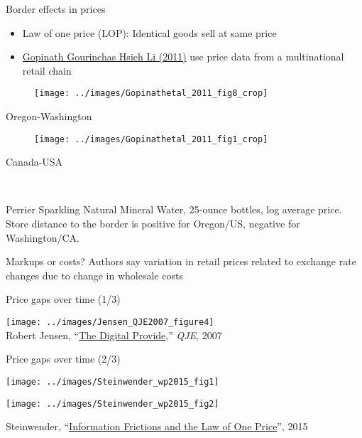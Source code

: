 \documentclass[10pt,notes=hide,aspectratio=169]{beamer}
\begin{document}
\begin{frame}{Border effects in prices}
\begin{itemize}
	\item Law of one price (LOP): Identical goods sell at same price
	\item \href{https://www.aeaweb.org/articles?id=10.1257/aer.101.6.2450}{Gopinath Gourinchas Hsieh Li (2011)} use price data from a multinational retail chain
\end{itemize}
	\begin{minipage}{.45\textwidth} \begin{center}\begin{figure} \texttt{[image: ../images/Gopinathetal\_2011\_fig8\_crop]}\end{figure} Oregon-Washington \end{center} \end{minipage}
	\begin{minipage}{.45\textwidth} \begin{center}\begin{figure} \texttt{[image: ../images/Gopinathetal\_2011\_fig1\_crop]}\end{figure} Canada-USA \end{center} \end{minipage} \\ \vspace{0.1in}
	{\scriptsize Perrier Sparkling Natural Mineral Water, 25-ounce bottles, log average price. Store distance to the border is positive for Oregon/US, negative for Washington/CA. \par }
Markups or costs? Authors say variation in retail prices related to exchange rate changes due to change in wholesale costs
\end{frame}
\begin{frame}{Price gaps over time (1/3)}
\begin{center}\texttt{[image: ../images/Jensen\_QJE2007\_figure4]} \\ \footnotesize{Robert Jensen, ``\href{http://qje.oxfordjournals.org/content/122/3/879.abstract}{The Digital Provide},'' \textit{QJE}, 2007}\end{center}
\end{frame}
\begin{frame}{Price gaps over time (2/3)}
\begin{minipage}{.47\textwidth}\vspace{0pt}\texttt{[image: ../images/Steinwender\_wp2015\_fig1]}\end{minipage}
\begin{minipage}{.47\textwidth}\vspace{0pt}\texttt{[image: ../images/Steinwender\_wp2015\_fig2]}\end{minipage}
\begin{center}\footnotesize{Steinwender, ``\href{https://sites.google.com/site/clsteinwender/home/research}{Information Frictions and the Law of One Price}'', 2015} \end{center}
\end{frame}
\end{document}
